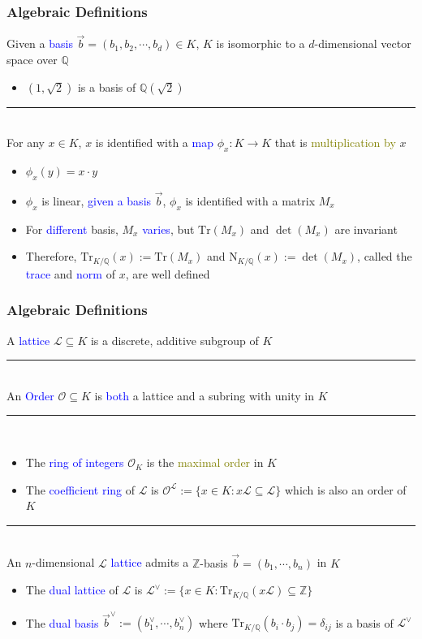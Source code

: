 \documentclass{beamer}
\newcommand{\blue}[1]{\textcolor{blue}{#1}}
\newcommand{\dgreen}[1]{\textcolor{dgreen}{#1}}
\newcommand{\olive}[1]{\textcolor{olive}{#1}}
\newcommand{\cL}{\mathcal{L}}
\newcommand{\cO}{\mathcal{O}}
\newcommand{\bbQ}{\mathbb{Q}}
\newcommand{\bbZ}{\mathbb{Z}}
\newcommand{\Tr}{\mathrm{Tr}}
\newcommand{\TrKQ}{\mathrm{Tr}_{K/\mathbb{Q}}}
\newcommand{\NKQ}{\mathrm{N}_{K/\mathbb{Q}}}
\newcommand{\cOL}{\mathcal{O}^{\mathcal{L}}}
\newcommand{\cLV}{\mathcal{L}^{\vee}}
\newcommand{\vb}{\vec{b}}
\newcommand{\vbV}{\vec{b}^{\vee}}
\begin{document}
\frame
{
  \frametitle{Algebraic Definitions}
  Given a \blue{basis} $\vec{b}=(b_1,b_2,\cdots,b_d)\in K$, $K$ is isomorphic to a $d$-dimensional \dgreen{vector space} over $\bbQ$
  \begin{itemize}
  	\item $(1,\sqrt{2})$ is a basis of $\bbQ(\sqrt{2})$
  \end{itemize}

  \noindent\rule{6cm}{0.4pt}\\
  For any $x\in K$, $x$ is identified with a \blue{map} $\phi_x:K\to K$ that is \olive{multiplication by} $x$
  \begin{itemize}
  	\item $\phi_x(y)=x\cdot y$
  	\item $\phi_x$ is linear, \blue{given a basis} $\vec{b}$, $\phi_x$ is \dgreen{identified with a matrix} $M_x$
  	\item For \blue{different} basis, $M_x$ \blue{varies}, but $\Tr(M_x)$ and $\det(M_x)$ are \dgreen{invariant}
  	\item Therefore, $\TrKQ(x):=\Tr(M_x)$ and $\NKQ(x):=\det(M_x)$, called the \blue{trace} and \blue{norm} of $x$, are \dgreen{well defined}
  \end{itemize}
}

\frame
{
  \frametitle{Algebraic Definitions}
  A \blue{lattice} $\cL\subseteq K$ is a \dgreen{discrete}, \dgreen{additive subgroup} of $K$

  \noindent\rule{6cm}{0.4pt}\\
  An \blue{Order} $\cO\subseteq K$ is \blue{both} a \dgreen{lattice} and a \dgreen{subring with unity} in $K$

  \noindent\rule{6cm}{0.4pt}\\
  \begin{itemize}
  	\item The \blue{ring of integers} $\cO_K$ is the \olive{maximal order} in $K$
  	\item The \blue{coefficient ring} of $\cL$ is $\cOL:=\{x\in K:x\cL\subseteq\cL\}$ which is \dgreen{also an order} of $K$
  \end{itemize}

  \noindent\rule{6cm}{0.4pt}\\
  An $n$-dimensional $\cL$ \blue{lattice} admits a \dgreen{$\bbZ$-basis} $\vb=(b_1,\cdots,b_n)$ in $K$
  \begin{itemize}
  	\item The \blue{dual lattice} of $\cL$ is $\cLV:=\{x\in K:\TrKQ(x\cL)\subseteq\bbZ\}$
  	\item The \blue{dual basis} $\vbV:=(b_1^{\vee},\cdots,b_n^{\vee})$ where $\TrKQ(b_i\cdot b_j)=\delta_{ij}$ \dgreen{is a basis of} $\cLV$
  \end{itemize}
}
\end{document}
